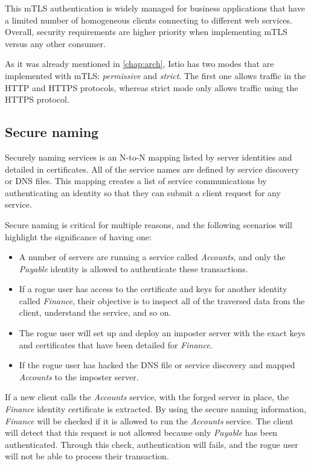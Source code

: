 This mTLS authentication is widely managed for business applications that have a limited number of homogeneous clients connecting to different web services. Overall, security requirements are higher priority when implementing mTLS versus any other consumer.

As it was already mentioned in \ref{chap:arch}, Istio has two modes that are implemented with mTLS: \textit{permissive} and \textit{strict}. The first one allows traffic in the HTTP and HTTPS protocols, whereas strict mode only allows traffic using the HTTPS protocol.

\subsection{Secure naming}
Securely naming services is an N-to-N mapping listed by server identities and detailed in certificates. All of the service names are defined by service discovery or DNS files. This mapping creates a list of service communications by authenticating an identity so that they can submit a client request for any service.

Secure naming is critical for multiple reasons, and the following scenarios will highlight the significance of having one:

\begin{itemize}
    \item A number of servers are running a service called \textit{Accounts}, and only the \textit{Payable} identity is allowed to authenticate these transactions.
    \item If a rogue user has access to the certificate and keys for another identity called \textit{Finance}, their objective is to inspect all of the traversed data from the client, understand the service, and so on.
    \item The rogue user will set up and deploy an imposter server with the exact keys and certificates that have been detailed for \textit{Finance}.
    \item If the rogue user has hacked the DNS file or service discovery and mapped \textit{Accounts} to the imposter server.
\end{itemize}

If a new client calls the \textit{Accounts} service, with the forged server in place, the \textit{Finance} identity certificate is extracted. By using the secure naming information, \textit{Finance} will be checked if it is allowed to run the \textit{Accounts} service. The client will detect that this request is not allowed because only \textit{Payable} has been authenticated. Through this check, authentication will fails, and the rogue user will not be able to process their transaction.


